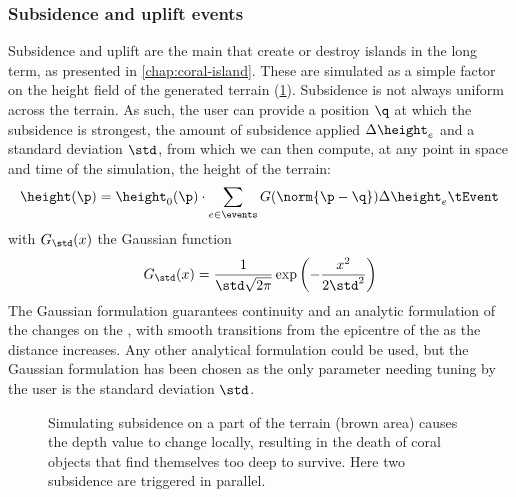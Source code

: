 \subsubsection{Subsidence and uplift events}
Subsidence and uplift are the main  that create or destroy islands in the long term, as presented in \cref{chap:coral-island}. These  are simulated as a simple factor on the height field of the generated terrain (\cref{fig:env-obj-subsidence-event}). Subsidence is not always uniform across the terrain. As such, the user can provide a position $\q$ at which the subsidence is strongest, the amount of subsidence applied $\Delta \height_e$ and a standard deviation $\std$, from which we can then compute, at any point in space and time of the simulation, the height of the terrain:
\begin{align*}
\height(\p) = \height_0(\p) \cdot \sum_{e \in \events}{G(\norm{\p - \q})} \Delta \height_e \tEvent
\end{align*}
with $G_{\std}(x)$ the Gaussian function
\begin{align}
G_{\std}(x) = \frac{1}{\std \sqrt{2\pi}} \exp \left(-\frac {x^{2}}{2 \std ^{2}}\right)
\end{align}
The Gaussian formulation guarantees continuity and an analytic formulation of the changes on the , with smooth transitions from the epicentre of the  as the distance increases. Any other analytical formulation could be used, but the Gaussian formulation has been chosen as the only parameter needing tuning by the user is the standard deviation $\std$.

\begin{figure}
\caption{Simulating subsidence on a part of the terrain (brown area) causes the depth value to change locally, resulting in the death of coral objects that find themselves too deep to survive. Here two subsidence  are triggered in parallel.}
\label{fig:env-obj-subsidence-event}
\end{figure}


